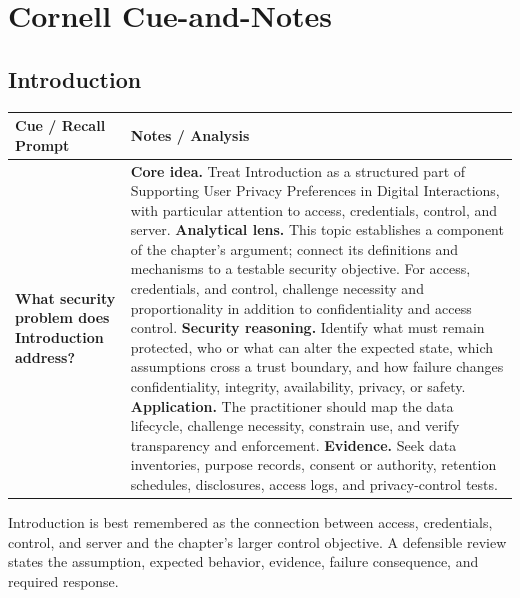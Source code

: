 \documentclass[11pt]{article}
\newcommand{\CornellHeader}{%
\rowcolor{Navy}\color{white}\bfseries Cue / Recall Prompt & \color{white}\bfseries Notes / Analysis\\\hline}
\newcommand{\CornellRow}[2]{%
\cellcolor{CueGray}\RaggedRight\textbf{#1} & \RaggedRight #2\\\hline}
\begin{document}
\section*{Cornell Cue-and-Notes}
\subsection*{Introduction}
\begin{longtable}{>{\RaggedRight\arraybackslash}p{}|>{\RaggedRight\arraybackslash}p{}}
\CornellHeader
\CornellRow{What security problem does Introduction address?}{\textbf{Core idea.} Treat Introduction as a structured part of Supporting User Privacy Preferences in Digital Interactions, with particular attention to access, credentials, control, and server. \textbf{Analytical lens.} This topic establishes a component of the chapter's argument; connect its definitions and mechanisms to a testable security objective. For access, credentials, and control, challenge necessity and proportionality in addition to confidentiality and access control. \textbf{Security reasoning.} Identify what must remain protected, who or what can alter the expected state, which assumptions cross a trust boundary, and how failure changes confidentiality, integrity, availability, privacy, or safety. \textbf{Application.} The practitioner should map the data lifecycle, challenge necessity, constrain use, and verify transparency and enforcement. \textbf{Evidence.} Seek data inventories, purpose records, consent or authority, retention schedules, disclosures, access logs, and privacy-control tests.}
\end{longtable}
\begin{topicsummary}
Introduction is best remembered as the connection between access, credentials, control, and server and the chapter's larger control objective. A defensible review states the assumption, expected behavior, evidence, failure consequence, and required response.
\end{topicsummary}
\end{document}
